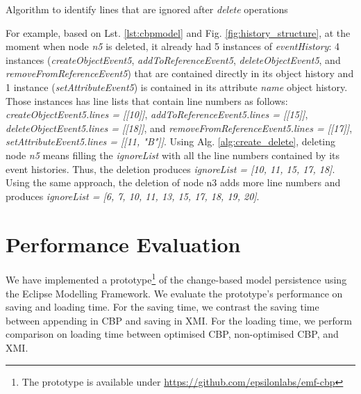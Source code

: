 \documentclass{llncs}
\begin{document}
{\begin{algorithm}
\begin{small}
\end{small}
\caption{Algorithm to identify lines that are ignored after \emph{delete} operations}
\label{alg:create_delete}
\end{algorithm}

For example, based on Lst. \ref{lst:cbpmodel} and Fig. \ref{fig:history_structure}, at the moment when node \emph{n5} is deleted, it already had 5 instances of \emph{eventHistory}: 4 instances (\emph{createObjectEvent5}, \emph{addToReferenceEvent5}, \emph{deleteObjectEvent5}, and \emph{removeFromReferenceEvent5}) that are contained directly in its object history and 1 instance (\emph{setAttributeEvent5}) is contained in its attribute \emph{name} object history. Those instances has line lists that contain line numbers as follows: \emph{createObjectEvent5.lines = [[10]]}, \emph{addToReferenceEvent5.lines = [[15]]}, \emph{deleteObjectEvent5.lines = [[18]]}, and \emph{removeFromReferenceEvent5.lines = [[17]]}, \emph{setAttributeEvent5.lines = [[11, "B"]]}. Using Alg. \ref{alg:create_delete}, deleting node \emph{n5} means filling the \emph{ignoreList} with all the line numbers contained by its event histories. Thus, the deletion produces \emph{ignoreList = [10, 11, 15, 17, 18]}. Using the same approach, the deletion of node n3 adds more line numbers and produces \emph{ignoreList = [6, 7, 10, 11, 13, 15, 17, 18, 19, 20]}.

\section{Performance Evaluation}
\label{sec:performance_evaluation}
We have implemented a prototype\footnote{The prototype is available under \url{https://github.com/epsilonlabs/emf-cbp}} of the change-based model persistence using the Eclipse Modelling Framework. We evaluate the prototype's performance on saving and loading time. For the saving time, we contrast the saving time between appending in CBP and saving in XMI. For the loading time, we perform comparison on loading time between optimised CBP, non-optimised CBP, and XMI.

}
\end{document}
